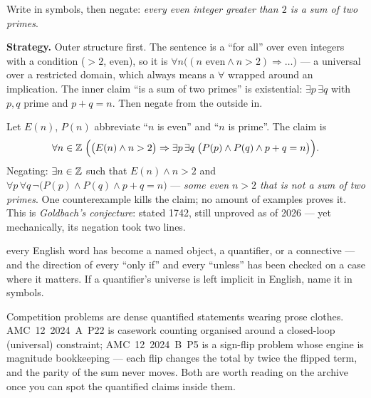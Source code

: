 \begin{example}\label{ex:goldbach}
Write in symbols, then negate: \emph{every even integer greater than $2$ is a sum of
two primes}.
\par\smallskip
\textbf{Strategy.} Outer structure first. The sentence is a ``for all'' over even
integers with a condition ($>2$, even), so it is $\forall n \bigl((n \text{ even}
\land n>2) \Rightarrow \dots\bigr)$ --- a universal over a restricted domain, which
always means a $\forall$ wrapped around an implication. The inner claim ``is a sum
of two primes'' is existential: $\exists p\,\exists q$ with $p,q$ prime and
$p+q=n$. Then negate from the outside in.
\par\smallskip
\begin{solution}
Let $E(n)$, $P(n)$ abbreviate ``$n$ is even'' and ``$n$ is prime''. The claim is
\[
\forall n\in\mathbb{Z}\;\Bigl( \bigl(E(n)\land n>2\bigr) \Rightarrow
\exists p\,\exists q\;\bigl(P(p)\land P(q)\land p+q=n\bigr)\Bigr).
\]
Negating: $\exists n\in\mathbb{Z}$ such that $E(n)\land n>2$ and
$\forall p\,\forall q\,\lnot\bigl(P(p)\land P(q)\land p+q=n\bigr)$ ---
\emph{some even $n>2$ that is not a sum of two primes}. One counterexample kills the
claim; no amount of examples proves it. This is \emph{Goldbach's
conjecture}: stated 1742, still unproved as of
2026 --- yet mechanically, its negation took two lines.
\end{solution}
\end{example}

\begin{wins}
every English word has become a named object, a quantifier, or a connective ---
and the direction of every ``only if'' and every ``unless'' has been checked on a
case where it matters. If a quantifier's universe is left implicit in English, name
it in symbols.
\end{wins}

\begin{remark}
Competition problems are dense quantified statements wearing prose clothes.
AMC~12~2024~A~P22 is casework counting organised around a closed-loop (universal)
constraint; AMC~12~2024~B~P5 is a sign-flip problem whose engine is magnitude
bookkeeping --- each flip changes the total by twice the flipped term, and the
parity of the sum never moves. Both are worth reading on the archive~
\cite{aops-amc} once you can spot the quantified claims inside them.
\end{remark}

